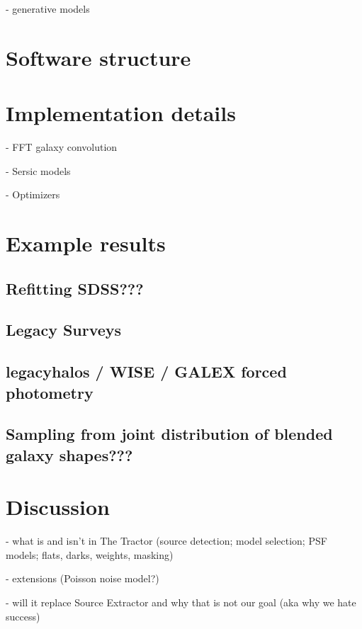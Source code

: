 \documentclass[linenumbers]{aastex631}
\begin{document}
- generative models

\cite{2009AJ....137.4400L}

\section{Software structure}

\section{Implementation details}

- FFT galaxy convolution

- Sersic models

- Optimizers

\section{Example results}

\subsection{Refitting SDSS???}

\subsection{Legacy Surveys}

\subsection{legacyhalos / WISE / GALEX forced photometry}

\subsection{Sampling from joint distribution of blended galaxy shapes???}


\section{Discussion}

- what is and isn't in The Tractor (source detection; model selection; PSF models; flats, darks, weights, masking)

- extensions (Poisson noise model?)

- will it replace Source Extractor and why that is not our goal (aka why we hate success)



\software{%
          }


{}

\end{document}

